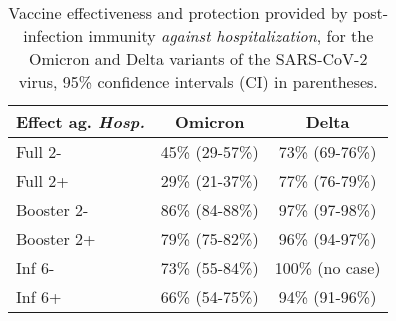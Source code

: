 \documentclass[a4paper,12pt]{article}
\def\nocase{no case}
\begin{document}
\thispagestyle{empty}
\setcounter{table}{1}
%
\begin{table}[!ht]
\caption{Vaccine effectiveness and protection provided by post-infection immunity {\it against hospitalization}, for the Omicron and Delta variants of the SARS-CoV-2 virus, 95\% confidence intervals (CI) in parentheses.}
\vspace{2mm}
\label{tabHalone}
\centering
\begin{tabular}{|l|c|c|}
\hline
\cellcolor{gray!20}Effect ag. {\it Hosp.} & \cellcolor{gray!20} Omicron & \cellcolor{gray!20} Delta \\
\hline
Full 2-&45\% (29-57\%)&73\% (69-76\%)\\
\cellcolor{gray!10}Full 2+&\cellcolor{gray!10}29\% (21-37\%) &\cellcolor{gray!10}77\% (76-79\%)\\
Booster 2-&86\% (84-88\%)&97\% (97-98\%)\\
\cellcolor{gray!10}Booster 2+&\cellcolor{gray!10}79\% (75-82\%)&\cellcolor{gray!10}96\% (94-97\%)\\
Inf 6-& 
73\% (55-84\%)
&100\% (\nocase)\\
\cellcolor{gray!10}Inf 6+&\cellcolor{gray!10}
66\% (54-75\%) 
&\cellcolor{gray!10}94\% (91-96\%)\\
\hline
\end{tabular}
\end{table}
\end{document}
